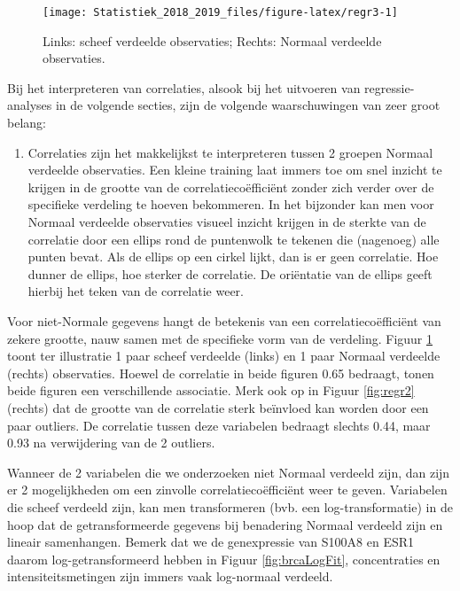 \documentclass[12pt,dutch,coursenotes]{book}
\providecommand{\tightlist}{%
  \setlength{\itemsep}{0pt}\setlength{\parskip}{0pt}}
\theoremstyle{definition}
\theoremstyle{definition}
\theoremstyle{definition}
\theoremstyle{remark}
\begin{document}
\begin{figure}

{\centering \texttt{[image: Statistiek\_2018\_2019\_files/figure-latex/regr3-1]} 

}

\caption{Links: scheef verdeelde observaties; Rechts: Normaal verdeelde observaties.}\label{fig:regr3}
\end{figure}

Bij het interpreteren van correlaties, alsook bij het uitvoeren van
regressie-analyses in de volgende secties, zijn de volgende
waarschuwingen van zeer groot belang:

\begin{enumerate}
\def\labelenumi{\arabic{enumi}.}
\tightlist
\item
  Correlaties zijn het makkelijkst te interpreteren tussen 2 groepen
  Normaal verdeelde observaties. Een kleine training laat immers toe om
  snel inzicht te krijgen in de grootte van de correlatiecoëfficiënt
  zonder zich verder over de specifieke verdeling te hoeven bekommeren.
  In het bijzonder kan men voor Normaal verdeelde observaties visueel
  inzicht krijgen in de sterkte van de correlatie door een ellips rond
  de puntenwolk te tekenen die (nagenoeg) alle punten bevat. Als de
  ellips op een cirkel lijkt, dan is er geen correlatie. Hoe dunner de
  ellips, hoe sterker de correlatie. De oriëntatie van de ellips geeft
  hierbij het teken van de correlatie weer.
\end{enumerate}

Voor niet-Normale gegevens hangt de betekenis van een
correlatiecoëfficiënt van zekere grootte, nauw samen met de specifieke
vorm van de verdeling. Figuur \ref{fig:regr3} toont ter illustratie 1
paar scheef verdeelde (links) en 1 paar Normaal verdeelde (rechts)
observaties. Hoewel de correlatie in beide figuren 0.65 bedraagt, tonen
beide figuren een verschillende associatie. Merk ook op in Figuur
\ref{fig:regr2} (rechts) dat de grootte van de correlatie sterk
beïnvloed kan worden door een paar outliers. De correlatie tussen deze
variabelen bedraagt slechts 0.44, maar 0.93 na verwijdering van de 2
outliers.

Wanneer de 2 variabelen die we onderzoeken niet Normaal verdeeld zijn,
dan zijn er 2 mogelijkheden om een zinvolle correlatiecoëfficiënt weer
te geven. Variabelen die scheef verdeeld zijn, kan men transformeren
(bvb. een log-transformatie) in de hoop dat de getransformeerde gegevens
bij benadering Normaal verdeeld zijn en lineair samenhangen. Bemerk dat
we de genexpressie van S100A8 en ESR1 daarom log-getransformeerd hebben
in Figuur \ref{fig:brcaLogFit}, concentraties en intensiteitsmetingen
zijn immers vaak log-normaal verdeeld.
\end{document}
